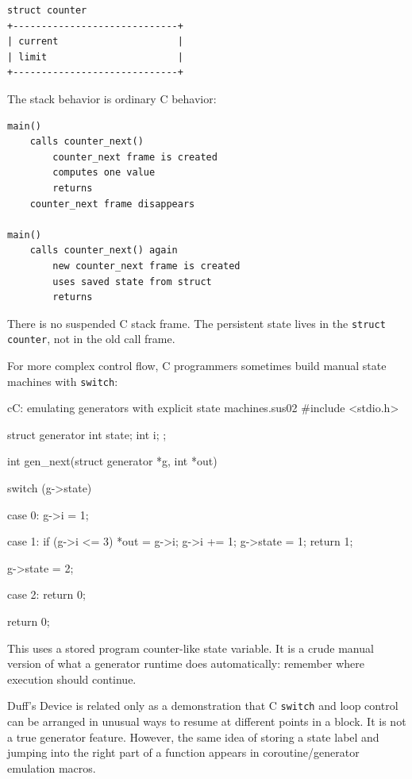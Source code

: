 \begin{verbatim}
struct counter
+-----------------------------+
| current                     |
| limit                       |
+-----------------------------+
\end{verbatim}

The stack behavior is ordinary C behavior:

\begin{verbatim}
main()
    calls counter_next()
        counter_next frame is created
        computes one value
        returns
    counter_next frame disappears

main()
    calls counter_next() again
        new counter_next frame is created
        uses saved state from struct
        returns
\end{verbatim}

There is no suspended C stack frame. The persistent state lives in the \texttt{struct counter}, not in the old call frame.

For more complex control flow, C programmers sometimes build manual state machines with \texttt{switch}:

\begin{codebox}[]{c}{C: emulating generators with explicit state machines.}{sus02}
#include <stdio.h>

struct generator {
    int state;
    int i;
};

int gen_next(struct generator *g, int *out) {
    switch (g->state) {
        case 0:
            g->i = 1;

        case 1:
            if (g->i <= 3) {
                *out = g->i;
                g->i += 1;
                g->state = 1;
                return 1;
            }

            g->state = 2;

        case 2:
            return 0;
    }

    return 0;
}
\end{codebox}


This uses a stored program counter-like state variable. It is a crude manual version of what a generator runtime does automatically: remember where execution should continue.

Duff's Device is related only as a demonstration that C \texttt{switch} and loop control can be arranged in unusual ways to resume at different points in a block. It is not a true generator feature. However, the same idea of storing a state label and jumping into the right part of a function appears in coroutine/generator emulation macros.

